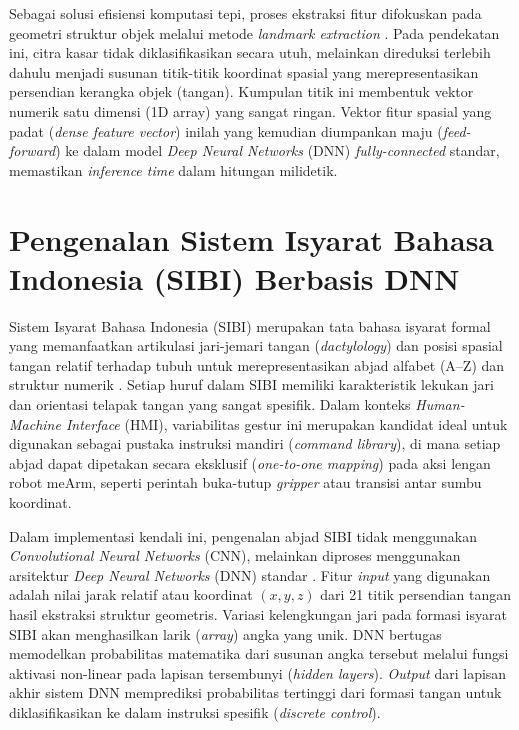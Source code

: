 Sebagai solusi efisiensi komputasi tepi, proses ekstraksi fitur difokuskan pada geometri struktur objek melalui metode \textit{landmark extraction} \cite{zhang2020}. Pada pendekatan ini, citra kasar tidak diklasifikasikan secara utuh, melainkan direduksi terlebih dahulu menjadi susunan titik-titik koordinat spasial yang merepresentasikan persendian kerangka objek (tangan). Kumpulan titik ini membentuk vektor numerik satu dimensi (1D array) yang sangat ringan. Vektor fitur spasial yang padat (\textit{dense feature vector}) inilah yang kemudian diumpankan maju (\textit{feed-forward}) ke dalam model \textit{Deep Neural Networks} (DNN) \textit{fully-connected} standar, memastikan \textit{inference time} dalam hitungan milidetik.

\section{Pengenalan Sistem Isyarat Bahasa Indonesia (SIBI) Berbasis DNN}
Sistem Isyarat Bahasa Indonesia (SIBI) merupakan tata bahasa isyarat formal yang memanfaatkan artikulasi jari-jemari tangan (\textit{dactylology}) dan posisi spasial tangan relatif terhadap tubuh untuk merepresentasikan abjad alfabet (A--Z) dan struktur numerik \cite{kosasih2012}. Setiap huruf dalam SIBI memiliki karakteristik lekukan jari dan orientasi telapak tangan yang sangat spesifik. Dalam konteks \textit{Human-Machine Interface} (HMI), variabilitas gestur ini merupakan kandidat ideal untuk digunakan sebagai pustaka instruksi mandiri (\textit{command library}), di mana setiap abjad dapat dipetakan secara eksklusif (\textit{one-to-one mapping}) pada aksi lengan robot meArm, seperti perintah buka-tutup \textit{gripper} atau transisi antar sumbu koordinat.

Dalam implementasi kendali ini, pengenalan abjad SIBI tidak menggunakan \textit{Convolutional Neural Networks} (CNN), melainkan diproses menggunakan arsitektur \textit{Deep Neural Networks} (DNN) standar \cite{goodfellow2016}. Fitur \textit{input} yang digunakan adalah nilai jarak relatif atau koordinat $(x,y,z)$ dari 21 titik persendian tangan hasil ekstraksi struktur geometris. Variasi kelengkungan jari pada formasi isyarat SIBI akan menghasilkan larik (\textit{array}) angka yang unik. DNN bertugas memodelkan probabilitas matematika dari susunan angka tersebut melalui fungsi aktivasi non-linear pada lapisan tersembunyi (\textit{hidden layers}). \textit{Output} dari lapisan akhir sistem DNN memprediksi probabilitas tertinggi dari formasi tangan untuk diklasifikasikan ke dalam instruksi spesifik (\textit{discrete control}).

